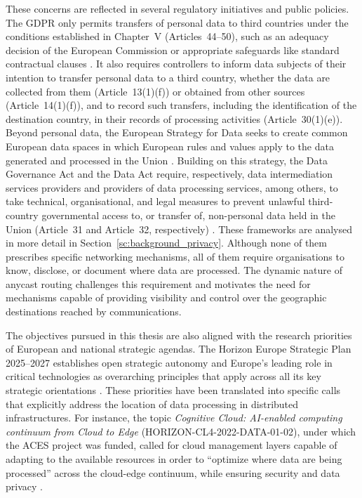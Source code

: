 \documentclass[
A4paper,                %
twoside,                %
openright,              %
chapterprefix=true,     %
12pt,                   %
headings=normal,        %
titlepage=on            %
]{book}
\begin{document}
These concerns are reflected in several regulatory initiatives and public policies. The GDPR only permits transfers of personal data to third countries under the conditions established in Chapter~V (Articles~44--50), such as an adequacy decision of the European Commission or appropriate safeguards like standard contractual clauses \cite{REGULATIONSRelevance}. It also requires controllers to inform data subjects of their intention to transfer personal data to a third country, whether the data are collected from them (Article~13(1)(f)) or obtained from other sources (Article~14(1)(f)), and to record such transfers, including the identification of the destination country, in their records of processing activities (Article~30(1)(e)). Beyond personal data, the European Strategy for Data seeks to create common European data spaces in which European rules and values apply to the data generated and processed in the Union \cite{COMMUNICATIONData}. Building on this strategy, the Data Governance Act and the Data Act require, respectively, data intermediation services providers and providers of data processing services, among others, to take technical, organisational, and legal measures to prevent unlawful third-country governmental access to, or transfer of, non-personal data held in the Union (Article~31 and Article~32, respectively) \cite{2022DataActb, 2022DataAct}. These frameworks are analysed in more detail in Section~\ref{sc:background_privacy}. Although none of them prescribes specific networking mechanisms, all of them require organisations to know, disclose, or document where data are processed. The dynamic nature of anycast routing challenges this requirement and motivates the need for mechanisms capable of providing visibility and control over the geographic destinations reached by communications.

The objectives pursued in this thesis are also aligned with the research priorities of European and national strategic agendas. The Horizon Europe Strategic Plan 2025--2027 establishes open strategic autonomy and Europe's leading role in critical technologies as overarching principles that apply across all its key strategic orientations \cite{StrategicCommission}. These priorities have been translated into specific calls that explicitly address the location of data processing in distributed infrastructures. For instance, the topic \textit{Cognitive Cloud: AI-enabled computing continuum from Cloud to Edge} (HORIZON-CL4-2022-DATA-01-02), under which the ACES project was funded, called for cloud management layers capable of adapting to the available resources in order to ``optimize where data are being processed'' across the cloud-edge continuum, while ensuring security and data privacy \cite{CognitiveCommission}.
\end{document}
